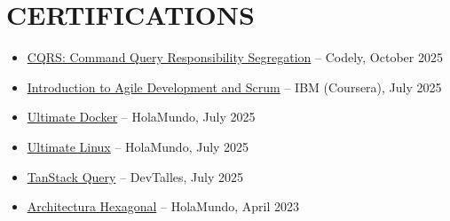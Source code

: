 \documentclass[a4paper,10pt]{article}
\begin{document}
\section*{CERTIFICATIONS}
\begin{itemize}[noitemsep, leftmargin=*]
    \item \href{https://www.linkedin.com/in/jose-carlos-huerta-garcia-773952212/details/certifications}{CQRS: Command Query Responsibility Segregation} -- Codely, October 2025
    \item \href{https://www.coursera.org/account/accomplishments/verify/D02Q5G7CT9H5}{Introduction to Agile Development and Scrum} -- IBM (Coursera), July 2025
    \item \href{https://academia.holamundo.io/certificates/fifvbfywmp}{Ultimate Docker} -- HolaMundo, July 2025
    \item \href{https://academia.holamundo.io/certificates/lsv1rybd6k}{Ultimate Linux} -- HolaMundo, July 2025
    \item \href{https://cursos.devtalles.com/certificates/80vdvpk0jq}{TanStack Query} -- DevTalles, July 2025
    \item \href{https://www.linkedin.com/in/jose-carlos-huerta-garcia-773952212/details/certifications/1758852008410/single-media-viewer/?profileId=ACoAADXjsscBqtjtdk4S_qpdkHwZsFn9y9TiG0o}{Architectura Hexagonal} -- HolaMundo, April 2023
\end{itemize}
\end{document}
